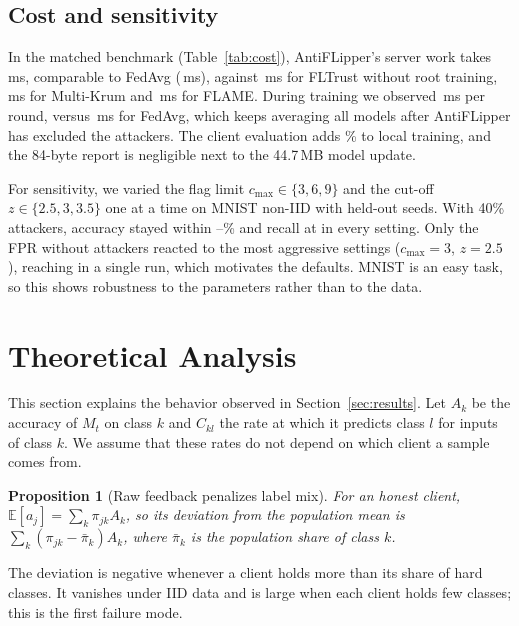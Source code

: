 \documentclass[conference]{IEEEtran}
\newtheorem{proposition}{Proposition}
\begin{document}
\subsection{Cost and sensitivity}

In the matched benchmark (Table~\ref{tab:cost}), AntiFLipper's server work takes \matchedOurs\,ms, comparable to FedAvg (\matchedFedAvg\,ms), against \matchedFLTrust\,ms for FLTrust without root training, \matchedKrum\,ms for Multi-Krum and \matchedFLAME\,ms for FLAME. During training we observed \,ms per round, versus \,ms for FedAvg, which keeps averaging all models after AntiFLipper has excluded the attackers. The client evaluation adds \evalOverhead\% to local training, and the 84-byte report is negligible next to the 44.7\,MB model update.

For sensitivity, we varied the flag limit $c_{\max}\in\{3,6,9\}$ and the cut-off $z\in\{2.5,3,3.5\}$ one at a time on MNIST non-IID with held-out seeds. With 40\% attackers, accuracy stayed within \sensAccMin--\sensAccMax\% and recall at \sensRecallMin{} in every setting. Only the FPR without attackers reacted to the most aggressive settings ($c_{\max}{=}3$, $z{=}2.5$), reaching \sensFPRmax{} in a single run, which motivates the defaults. MNIST is an easy task, so this shows robustness to the parameters rather than to the data.

\section{Theoretical Analysis}
\label{sec:analysis}
This section explains the behavior observed in Section~\ref{sec:results}. Let $A_k$ be the accuracy of $M_t$ on class $k$ and $C_{kl}$ the rate at which it predicts class $l$ for inputs of class $k$. We assume that these rates do not depend on which client a sample comes from.

\begin{proposition}[Raw feedback penalizes label mix]\label{prop:mix}
For an honest client, $\mathbb{E}[a_j]=\sum_k\pi_{jk}A_k$, so its deviation from the population mean is $\sum_k(\pi_{jk}-\bar\pi_k)A_k$, where $\bar\pi_k$ is the population share of class $k$.
\end{proposition}

The deviation is negative whenever a client holds more than its share of hard classes. It vanishes under IID data and is large when each client holds few classes; this is the first failure mode.
\end{document}

